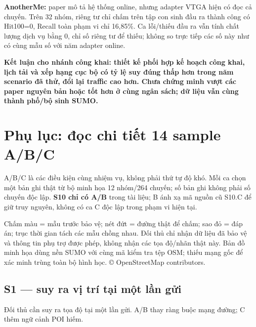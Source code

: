 \documentclass[10pt,a4paper]{article}
\newcommand{\key}[1]{\par\smallskip\noindent\colorbox{pale}{\parbox{\dimexpr\linewidth-2\fboxsep}{\textbf{#1}}}\par\smallskip}
\begin{document}
\textbf{AnotherMe:} paper mô tả hệ thống online, nhưng adapter VTGA hiện có đọc cả chuyến. Trên 32 nhóm, riêng tư chỉ chấm trên tập con sinh đầu ra thành công có Hit100=0, Recall toàn phạm vi chỉ 16,85\%. Ca lỗi/thiếu đầu ra vẫn tính chất lượng dịch vụ bằng 0, chỉ số riêng tư để thiếu; không so trực tiếp các số này như có cùng mẫu số với năm adapter online.

\key{Kết luận cho nhánh công khai: thiết kế phối hợp kế hoạch công khai, lịch tải và xếp hạng cục bộ có tỷ lệ suy đúng thấp hơn trong năm scenario đã thử, đổi lại traffic cao hơn. Chưa chứng minh vượt các paper nguyên bản hoặc tốt hơn ở cùng ngân sách; dữ liệu vẫn cùng thành phố/bộ sinh SUMO.}


\clearpage
\section{Phụ lục: đọc chi tiết 14 sample A/B/C}\label{sec:4}
A/B/C là các điều kiện cùng nhiệm vụ, không phải thứ tự độ khó. Mỗi ca chọn một bản ghi thật từ bộ minh họa 12 nhóm/264 chuyến; số bản ghi không phải số chuyến độc lập. \textbf{S10 chỉ có A/B} trong tài liệu; B ánh xạ mã nguồn cũ S10.C để giữ truy nguyên, không có ca C độc lập trong phạm vi hiện tại.

Chấm màu = mẫu trước bảo vệ; nét đứt = đường thật để chấm; sao đỏ = đáp án; trục thời gian tách các mẫu chồng nhau. Đối thủ chỉ nhận dữ liệu đã bảo vệ và thông tin phụ trợ được phép, không nhận các tọa độ/nhãn thật này. Bản đồ minh họa dùng nền SUMO với cùng mã kiểm tra tệp OSM; thiếu mạng gốc để xác minh trùng toàn bộ hình học. © OpenStreetMap contributors.

\subsection{S1 — suy ra vị trí tại một lần gửi}\label{sub:4.1}
Đối thủ cần suy ra tọa độ tại một lần gửi. A/B thay ràng buộc mạng đường; C thêm ngữ cảnh POI hiếm.
\end{document}
